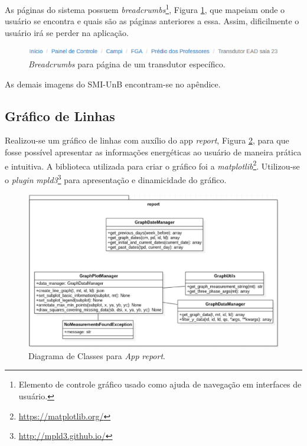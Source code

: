 As páginas do sistema possuem \textit{breadcrumbs}\footnote{Elemento de controle gráfico usado como ajuda de navegação em interfaces de usuário.}, Figura \ref{links}, que mapeiam onde o usuário se encontra e quais são as páginas anteriores a essa. Assim, dificilmente o usuário irá se perder na aplicação.

\begin{figure}[!h]
    \centering
    \includegraphics[scale=0.7]{figuras/links.eps}
    \caption{\textit{Breadcrumbs} para página de um transdutor específico.}
    \label{links}
\end{figure}

As demais imagens do SMI-UnB encontram-se no apêndice.

\subsection{Gráfico de Linhas}
Realizou-se um gráfico de linhas com auxílio do app \textit{report}, Figura \ref{app_report}, para que fosse possível apresentar as informações energéticas ao usuário de maneira prática e intuitiva. A biblioteca utilizada para criar o gráfico foi a \textit{matplotlib}\footnote{\url{https://matplotlib.org/}}. Utilizou-se o \textit{plugin} \textit{mpld3}\footnote{\url{http://mpld3.github.io/}} para apresentação e dinamicidade do gráfico.

\begin{figure}[!h]
    \centering
    \includegraphics[keepaspectratio=true,scale=0.6]{figuras/app_report.eps}
    \caption{Diagrama de Classes para \textit{App} \textit{report}.}
    \label{app_report}
\end{figure}

